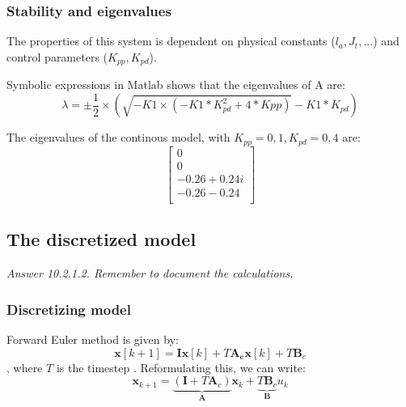 \subsubsection{Stability and eigenvalues}
The properties of this system is dependent on physical constants ($l_a, J_t, ...$) and control parameters ($K_{pp}, K_{pd}$).

Symbolic expressions in Matlab shows that the eigenvalues of A are:
\begin{equation}
	\lambda = \pm \frac{1}{2} \times \left( \sqrt{-K1 \times (-K1*K_{pd}^2 + 4*Kpp)} - K1*K_{pd} \right)
\end{equation}

The eigenvalues of the continous model, with $K_{pp} = 0,1 , K_{pd} = 0,4$ are:
\begin{equation}\label{eq:lab2_ss_c_eigenvalues_example}
	\begin{bmatrix}
		0 \\ 0 \\ -0.26 + 0.24i \\ -0.26 - 0.24 \\
	\end{bmatrix}
\end{equation}




\subsection{The discretized model}
\textit{Answer 10.2.1.2. Remember to document the calculations.}  \\
\subsubsection{Discretizing model}
Forward Euler method is given by:
\begin{equation}\label{eq:lab2_forward_euler}
	\bm{x}[k + 1] = \bm I \bm x[k] + T\bm{A_c x}[k] + T\bm B_c
\end{equation}, where $ T $ is the timestep .
Reformulating this, we can write:
\begin{equation}\label{eq:lab2_discrete_system}
	\bm{x}_{k + 1} = \underbrace{(\bm I + T \bm A_c)}_{\bm A} \bm{x}_{k} + \underbrace{T \bm B_c}_{\bm B} u_k
\end{equation}


